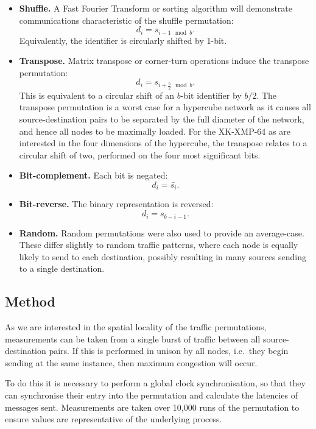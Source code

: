 \begin{itemize}

\item {\bf Shuffle.} A Fast Fourier Transform or sorting algorithm will
demonstrate communications characteristic of the shuffle permutation:
$$d_i=s_{i-1\mod b}.$$ 
Equivalently, the identifier is circularly shifted by 1-bit.

\item {\bf Transpose.} Matrix transpose or corner-turn operations induce the
transpose permutation: $$d_i = s_{i+\frac{b}{2}\mod b}.$$ This is equivalent to
a circular shift of an $b$-bit identifier by $b/2$.  The transpose permutation
is a worst case for a hypercube network as it causes all source-destination
pairs to be separated by the full diameter of the network, and hence all nodes
to be maximally loaded.  For the XK-XMP-64 as are interested in the four dimensions
of the hypercube, the transpose relates to a circular shift of two, performed on
the four most significant bits.

\item {\bf Bit-complement.} Each bit is negated: $$d_i = \bar{s_i}.$$

\item {\bf Bit-reverse.} The binary representation is reversed: $$d_i = s_{b-i-1}.$$

\item {\bf Random.} Random permutations were also used to provide an
average-case. These differ slightly to random traffic patterns, where each node
is equally likely to send to each destination, possibly resulting in many
sources sending to a single destination.

\end{itemize}

\subsection{Method}

As we are interested in the spatial locality of the traffic permutations,
measurements can be taken from a single burst of traffic between all
source-destination pairs. If this is performed in unison by all nodes, i.e.\
they begin sending at the same instance, then maximum congestion will occur.

To do this it is necessary to perform a global clock synchronisation, so that
they can synchronise their entry into the permutation and calculate the
latencies of messages sent. Measurements are taken over 10,000 runs of the
permutation to ensure values are representative of the underlying process.

